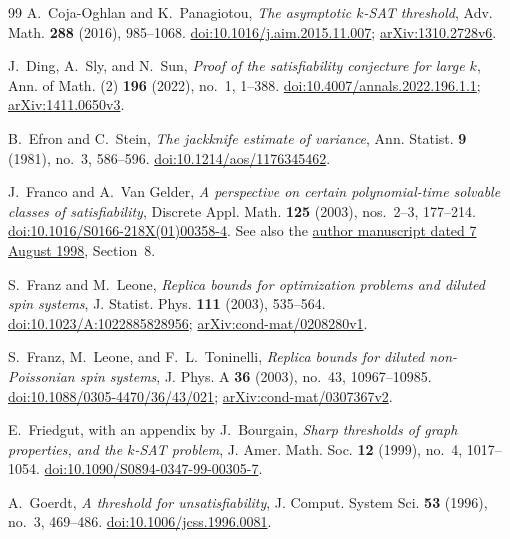 \begin{thebibliography}{99}
A.~Coja-Oghlan and K.~Panagiotou,
\emph{The asymptotic \(k\)-SAT threshold},
Adv. Math. \textbf{288} (2016), 985--1068.
\href{https://doi.org/10.1016/j.aim.2015.11.007}
{doi:10.1016/j.aim.2015.11.007};
\href{https://arxiv.org/abs/1310.2728v6}{arXiv:1310.2728v6}.

J.~Ding, A.~Sly, and N.~Sun,
\emph{Proof of the satisfiability conjecture for large \(k\)},
Ann. of Math. (2) \textbf{196} (2022), no.~1, 1--388.
\href{https://doi.org/10.4007/annals.2022.196.1.1}
{doi:10.4007/annals.2022.196.1.1};
\href{https://arxiv.org/abs/1411.0650v3}{arXiv:1411.0650v3}.

B.~Efron and C.~Stein,
\emph{The jackknife estimate of variance},
Ann. Statist. \textbf{9} (1981), no.~3, 586--596.
\href{https://doi.org/10.1214/aos/1176345462}{doi:10.1214/aos/1176345462}.

J.~Franco and A.~Van Gelder,
\emph{A perspective on certain polynomial-time solvable classes of
satisfiability},
Discrete Appl. Math. \textbf{125} (2003), nos.~2--3, 177--214.
\href{https://doi.org/10.1016/S0166-218X(01)00358-4}
{doi:10.1016/S0166-218X(01)00358-4}.
See also the \href{https://citeseerx.ist.psu.edu/document?doi=a79e4c87237fc557de1acc74371bc986f575a571&repid=rep1&type=pdf}{author manuscript dated 7 August 1998}, Section~8.

S.~Franz and M.~Leone,
\emph{Replica bounds for optimization problems and diluted spin systems},
J. Statist. Phys. \textbf{111} (2003), 535--564.
\href{https://doi.org/10.1023/A:1022885828956}{doi:10.1023/A:1022885828956};
\href{https://arxiv.org/abs/cond-mat/0208280v1}{arXiv:cond-mat/0208280v1}.

S.~Franz, M.~Leone, and F.~L.~Toninelli,
\emph{Replica bounds for diluted non-Poissonian spin systems},
J. Phys. A \textbf{36} (2003), no.~43, 10967--10985.
\href{https://doi.org/10.1088/0305-4470/36/43/021}
{doi:10.1088/0305-4470/36/43/021};
\href{https://arxiv.org/abs/cond-mat/0307367v2}{arXiv:cond-mat/0307367v2}.

E.~Friedgut, with an appendix by J.~Bourgain,
\emph{Sharp thresholds of graph properties, and the \(k\)-SAT problem},
J. Amer. Math. Soc. \textbf{12} (1999), no.~4, 1017--1054.
\href{https://doi.org/10.1090/S0894-0347-99-00305-7}
{doi:10.1090/S0894-0347-99-00305-7}.

A.~Goerdt,
\emph{A threshold for unsatisfiability},
J. Comput. System Sci. \textbf{53} (1996), no.~3, 469--486.
\href{https://doi.org/10.1006/jcss.1996.0081}{doi:10.1006/jcss.1996.0081}.


\end{thebibliography}
